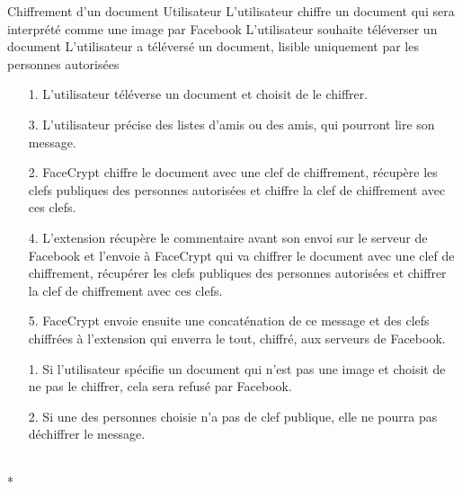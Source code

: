 \documentclass[a4paper,11pt,french]{article}
\begin{document}
\fiche
	{Chiffrement d'un document}
	{Utilisateur}
	{L'utilisateur chiffre un document qui sera interprété comme une image 
        par Facebook}
	{}
	{L'utilisateur souhaite téléverser un document}
	{L'utilisateur a téléversé un document, lisible uniquement par les personnes 
        autorisées}
	{\begin{itemize}
	    \item[]
	  \item[1.] L'utilisateur téléverse un document et choisit de le chiffrer.
      \item[3.] L'utilisateur précise des listes d'amis ou des amis, 
          qui pourront lire son message.
	\end{itemize}
	}
	{\begin{itemize}
        \item[]
		\item[2.] FaceCrypt chiffre le document avec une clef 
        de chiffrement, récupère les clefs publiques
        des personnes autorisées et chiffre la clef de chiffrement
        avec ces clefs.
		\item[4.] L'extension récupère le commentaire avant son envoi sur le 
            serveur de Facebook et l'envoie à FaceCrypt qui va chiffrer le 
            document avec une clef de chiffrement, récupérer  les clefs publiques
            des personnes autorisées et chiffrer la clef de chiffrement avec
            ces clefs.
		\item[5.] FaceCrypt envoie ensuite une concaténation de 
        ce message et des clefs chiffrées à l'extension qui enverra le tout,
        chiffré, aux serveurs de Facebook.
	\end{itemize}
	}
	{}
\flots
    {\begin{itemize}
    \item[]
    \item[1.] Si l'utilisateur spécifie un document qui n'est pas une image
    et choisit de ne pas le chiffrer, cela sera refusé par Facebook.
    \item[2.] Si une des personnes choisie n'a pas de clef publique,
        elle ne pourra pas déchiffrer le message.
    \end{itemize}
    }
	{}    
\\*
\end{document}
